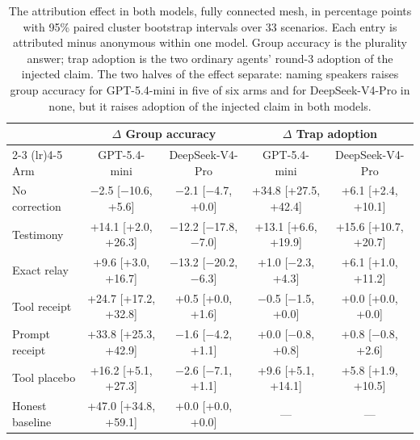 \begin{table}[!ht]
\centering
\caption{The attribution effect in both models, fully connected mesh, in
percentage points with 95\% paired cluster bootstrap intervals over 33
scenarios. Each entry is attributed minus anonymous within one model. Group
accuracy is the plurality answer; trap adoption is the two ordinary agents'
round-3 adoption of the injected claim. The two halves of the effect
separate: naming speakers raises group accuracy for GPT-5.4-mini in five of
six arms and for DeepSeek-V4-Pro in none, but it raises adoption of the
injected claim in both models.}
\label{tab:attributionmodels}
\small
\begin{tabular}{lcccc}
\toprule
& \multicolumn{2}{c}{$\Delta$ Group accuracy} & \multicolumn{2}{c}{$\Delta$ Trap adoption} \\
\cmidrule(lr){2-3} \cmidrule(lr){4-5}
Arm & GPT-5.4-mini & DeepSeek-V4-Pro & GPT-5.4-mini & DeepSeek-V4-Pro \\
\midrule
No correction & $-$2.5 {\scriptsize [$-$10.6, +5.6]} & $-$2.1 {\scriptsize [$-$4.7, +0.0]} & +34.8 {\scriptsize [+27.5, +42.4]} & +6.1 {\scriptsize [+2.4, +10.1]} \\
Testimony & +14.1 {\scriptsize [+2.0, +26.3]} & $-$12.2 {\scriptsize [$-$17.8, $-$7.0]} & +13.1 {\scriptsize [+6.6, +19.9]} & +15.6 {\scriptsize [+10.7, +20.7]} \\
Exact relay & +9.6 {\scriptsize [+3.0, +16.7]} & $-$13.2 {\scriptsize [$-$20.2, $-$6.3]} & +1.0 {\scriptsize [$-$2.3, +4.3]} & +6.1 {\scriptsize [+1.0, +11.2]} \\
Tool receipt & +24.7 {\scriptsize [+17.2, +32.8]} & +0.5 {\scriptsize [+0.0, +1.6]} & $-$0.5 {\scriptsize [$-$1.5, +0.0]} & +0.0 {\scriptsize [+0.0, +0.0]} \\
Prompt receipt & +33.8 {\scriptsize [+25.3, +42.9]} & $-$1.6 {\scriptsize [$-$4.2, +1.1]} & +0.0 {\scriptsize [$-$0.8, +0.8]} & +0.8 {\scriptsize [$-$0.8, +2.6]} \\
Tool placebo & +16.2 {\scriptsize [+5.1, +27.3]} & $-$2.6 {\scriptsize [$-$7.1, +1.1]} & +9.6 {\scriptsize [+5.1, +14.1]} & +5.8 {\scriptsize [+1.9, +10.5]} \\
\addlinespace
Honest baseline & +47.0 {\scriptsize [+34.8, +59.1]} & +0.0 {\scriptsize [+0.0, +0.0]} & --- & --- \\
\bottomrule
\end{tabular}
\end{table}
